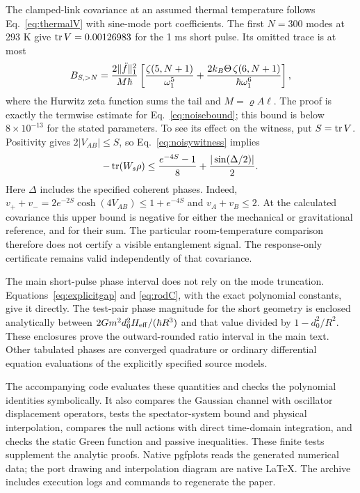 The clamped-link covariance at an assumed thermal temperature follows Eq.~\eqref{eq:thermalV} with sine-mode port coefficients. The first $N=300$ modes at 293 K give $\operatorname{tr} V=0.00126983$ for the 1 ms short pulse. Its omitted trace is at most
\begin{equation}
B_{S,>N}=\frac{2\norm{\ddot f}_1^2}{M\hbar}
\left[\frac{\zeta(5,N+1)}{\omega_1^5}
+\frac{2k_B\Theta\,\zeta(6,N+1)}{\hbar\omega_1^6}\right],
\label{eq:tail}
\end{equation}
where the Hurwitz zeta function sums the tail and $M=\varrho A\ell$. The proof is exactly the termwise estimate for Eq.~\eqref{eq:noisebound}; this bound is below $8\times10^{-13}$ for the stated parameters. To see its effect on the witness, put $S=\operatorname{tr} V$. Positivity gives $2|V_{AB}|\le S$, so Eq.~\eqref{eq:noisywitness} implies
\begin{equation}
-\tr(W_s\rho)\le\frac{e^{-4S}-1}{8}+\frac{|\sin(\Delta/2)|}{2}.
\label{eq:nowitness}
\end{equation}
Here $\Delta$ includes the specified coherent phases. Indeed, $v_++v_-=2e^{-2S}\cosh(4V_{AB})\le1+e^{-4S}$ and $v_A+v_B\le2$. At the calculated covariance this upper bound is negative for either the mechanical or gravitational reference, and for their sum. The particular room-temperature comparison therefore does not certify a visible entanglement signal. The response-only certificate remains valid independently of that covariance.

The main short-pulse phase interval does not rely on the mode truncation. Equations~\eqref{eq:explicitgap} and \eqref{eq:rodC}, with the exact polynomial constants, give it directly. The test-pair phase magnitude for the short geometry is enclosed analytically between $2Gm^2d_0^2H_{\rm eff}/(\hbar R^3)$ and that value divided by $1-d_0^2/R^2$. These enclosures prove the outward-rounded ratio interval in the main text. Other tabulated phases are converged quadrature or ordinary differential equation evaluations of the explicitly specified source models.

The accompanying code evaluates these quantities and checks the polynomial identities symbolically. It also compares the Gaussian channel with oscillator displacement operators, tests the spectator-system bound and physical interpolation, compares the null actions with direct time-domain integration, and checks the static Green function and passive inequalities. These finite tests supplement the analytic proofs. Native pgfplots reads the generated numerical data; the port drawing and interpolation diagram are native \LaTeX. The archive includes execution logs and commands to regenerate the paper.
